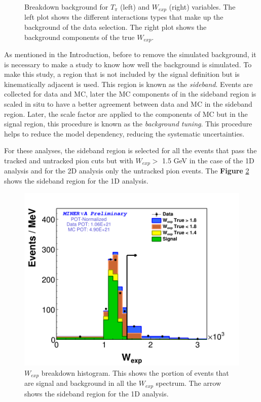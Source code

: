 \begin{figure}[!htb]
    \caption{Breakdown background for $T_\pi$ (left) and $W_{exp}$ (right) variables. The left plot shows the different interactions types that make up the background of the data selection. The right plot shows the background components of the true $W_{exp}$.}
    \label{fig:Analysis:BgStudies:SidebandTunning:BGBreakdownTpiWexp}
\end{figure}

As mentioned in the Introduction, before to remove the simulated background, it is necessary to make a study to know how well the background is simulated. To make this study, a region that is not included by the signal definition but is kinematically adjacent is used. This region is known as the \textit{sideband}. Events are collected for data and MC, later the MC components of in the sideband region is scaled in situ to have a better agreement between data and MC in the sideband region. Later, the scale factor are applied to the components of MC but in the signal region, this procedure is known as the \textit{ background tuning}. This procedure helps to reduce the model dependency, reducing the systematic uncertainties. 

For these analyses, the sideband region is selected for all the events that pass the tracked and untracked pion cuts but with $W_{exp} > $ 1.5 GeV in the case of the 1D analysis and for the 2D analysis only the untracked pion events. The \textbf{Figure} \ref{fig:Analysis:BgStudies:SidebandTunning:BreakdownWSideband} shows the sideband region for the 1D analysis. 

\begin{figure}[!htb]
    \centering
    \includegraphics[scale=0.3]{Figures/Chapter4/BGStudies/Breakdown_WSideband_wexp_fit_1Pi_PN_.png}
    \caption{$W_{exp}$ breakdown histogram. This  shows the portion of events that are signal and background in all the $W_{exp}$ spectrum. The arrow shows the sideband region for the 1D analysis.}
    \label{fig:Analysis:BgStudies:SidebandTunning:BreakdownWSideband} 
\end{figure}

